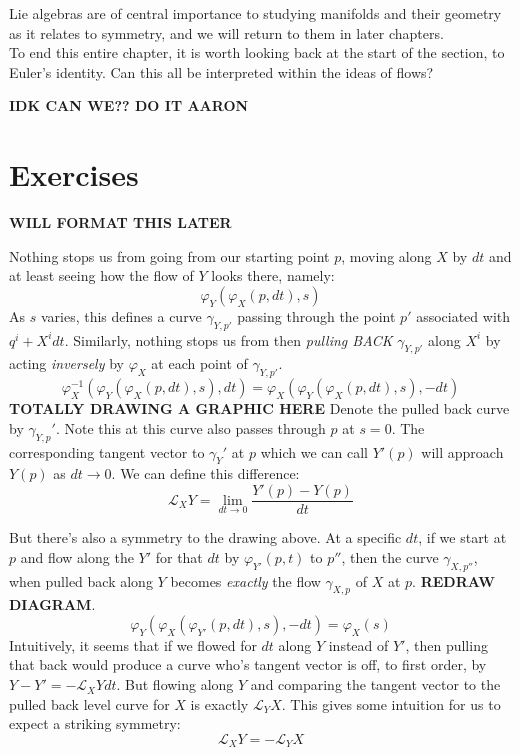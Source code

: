 		Lie algebras are of central importance to studying manifolds and their geometry as it relates to symmetry, and we will return to them in later chapters. \\
		
		To end this entire chapter, it is worth looking back at the start of the section, to Euler's identity. Can this all be interpreted within the ideas of flows? 
		
		
		\textbf{IDK CAN WE?? DO IT AARON}
		
		
	
	\section{Exercises}

	\textbf{WILL FORMAT THIS LATER}

Nothing stops us from going from our starting point $p$, moving along $X$ by $dt$ and at least seeing how the flow of $Y$ looks there, namely:
	\begin{equation}
		\varphi_{Y} (\varphi_{X}(p, dt), s)
	\end{equation}
	As $s$ varies, this defines a curve $\gamma_{Y,p'}$ passing through the point $p'$ associated with $q^i + X^i dt$. Similarly, nothing stops us from then \emph{pulling BACK} $\gamma_{Y,p'}$ along $X^i$ by acting \emph{inversely} by $\varphi_X$ at each point of $\gamma_{Y,p'}$.
	\begin{equation}
		\varphi^{-1}_X (\varphi_Y (\varphi_X(p, dt), s), dt)
		 = \varphi_X (\varphi_Y(\varphi_X(p, dt), s), -dt)
	\end{equation}
	\textbf{TOTALLY DRAWING A GRAPHIC HERE}
	Denote the pulled back curve by $\gamma_{Y,p}'$. Note this at this curve also passes through $p$ at $s=0$. The corresponding tangent vector to $\gamma_Y'$ at $p$ which we can call $Y'(p)$ will approach $Y(p)$ as $dt \rightarrow 0$. We can define this difference:
	\begin{equation}
		\mathcal L_X Y = \lim_{dt \rightarrow 0} \frac{Y'(p) - Y(p)}{dt}
	\end{equation}

	But there's also a symmetry to the drawing above. At a specific $dt$, if we start at $p$ and flow along the $Y'$ for that $dt$ by $\varphi_{Y'}(p, t)$ to $p''$, then the curve $\gamma_{X, p''}$, when pulled back along $Y$ becomes \emph{exactly} the flow $\gamma_{X,p}$ of $X$ at $p$.
	\textbf{REDRAW DIAGRAM}.
	\begin{equation}
		\varphi_Y (\varphi_X (\varphi_{Y'} (p, dt), s), -dt) =  \varphi_X(s)
	\end{equation}
	Intuitively, it seems that if we flowed for $dt$ along $Y$ instead of $Y'$, then pulling that back would produce a curve who's tangent vector is off, to first order, by $Y-Y' = - \mathcal L_X Y dt$. But flowing along $Y$ and comparing the tangent vector to the pulled back level curve for $X$ is exactly $\mathcal L_Y X$. This gives some intuition for us to expect a striking symmetry:
	\begin{equation}
		\mathcal L_X Y = - \mathcal L_Y X
	\end{equation}

